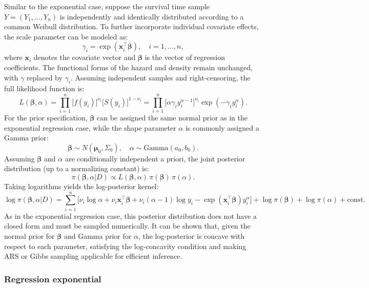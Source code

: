 Similar to the exponential case, suppose the survival time sample $Y = (Y_1, \ldots, Y_n)$ is independently and identically distributed according to a common Weibull distribution. To further incorporate individual covariate effects, the scale parameter can be modeled as:
$$
\gamma_i = \exp(\mathbf{x}_i^\top \boldsymbol{\beta}),
\quad i = 1, \ldots, n,
$$
where $\mathbf{x}_i$ denotes the covariate vector and $\boldsymbol{\beta}$ is the vector of regression coefficients. The functional forms of the hazard and density remain unchanged, with $\gamma$ replaced by $\gamma_i$.
Assuming independent samples and right-censoring, the full likelihood function is:
$$
L(\boldsymbol{\beta}, \alpha)
= \prod_{i=1}^n 
\big[ f(y_i) \big]^{\nu_i} 
\big[ S(y_i) \big]^{1 - \nu_i}
= \prod_{i=1}^n 
\big[ \alpha \gamma_i y_i^{\alpha - 1} \big]^{\nu_i} 
\exp(-\gamma_i y_i^\alpha).
$$
For the prior specification, $\boldsymbol{\beta}$ can be assigned the same normal prior as in the exponential regression case, while the shape parameter $\alpha$ is commonly assigned a Gamma prior:
$$
\boldsymbol{\beta} \sim N(\boldsymbol{\mu}_0, \Sigma_0), 
\quad 
\alpha \sim \text{Gamma}(a_0, b_0).
$$
Assuming $\boldsymbol{\beta}$ and $\alpha$ are conditionally independent a priori, the joint posterior distribution (up to a normalizing constant) is:
$$
\pi(\boldsymbol{\beta}, \alpha | D)
\propto L(\boldsymbol{\beta}, \alpha)
\, \pi(\boldsymbol{\beta})
\, \pi(\alpha).
$$
Taking logarithms yields the log-posterior kernel:
$$
\log \pi(\boldsymbol{\beta}, \alpha | D)
= \sum_{i=1}^n 
\big[
\nu_i \log \alpha + \nu_i \mathbf{x}_i^\top \boldsymbol{\beta} 
+ \nu_i (\alpha - 1) \log y_i 
- \exp(\mathbf{x}_i^\top \boldsymbol{\beta}) y_i^\alpha
\big]
+ \log \pi(\boldsymbol{\beta}) + \log \pi(\alpha) + \text{const}.
$$
As in the exponential regression case, this posterior distribution does not have a closed form and must be sampled numerically. It can be shown that, given the normal prior for $\boldsymbol{\beta}$ and Gamma prior for $\alpha$, the log-posterior is concave with respect to each parameter, satisfying the log-concavity condition and making ARS or Gibbs sampling applicable for efficient inference.





\subsubsection{Regression exponential}


